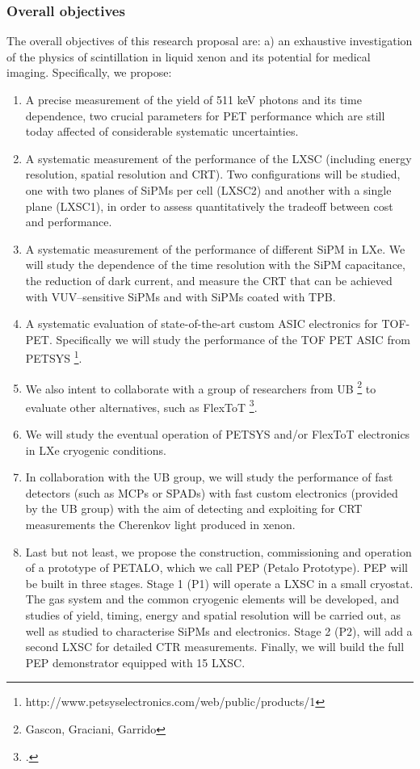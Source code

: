 \subsubsection*{Overall objectives}
The overall objectives of this research proposal are: a) an exhaustive investigation of the physics of scintillation in liquid xenon and its potential for medical imaging. Specifically, we propose:
\begin{enumerate}
\item A precise measurement of the yield of 511 keV photons and its time dependence, two crucial parameters for PET performance which are still today affected of considerable systematic uncertainties.
\item A systematic measurement of the performance of the LXSC (including energy resolution, spatial resolution and CRT). Two configurations will be studied, one with two planes of SiPMs per cell (LXSC2) and another with a single plane (LXSC1), in order to assess quantitatively the tradeoff between cost and performance.
\item A systematic measurement of the performance of different SiPM in LXe. We will study the dependence of the time resolution with the SiPM capacitance, the reduction of dark current, and measure the CRT that can be achieved with VUV--sensitive SiPMs and with SiPMs coated with TPB. 
\item A systematic evaluation of state-of-the-art custom ASIC electronics for TOF-PET. Specifically we will study the performance of the TOF PET ASIC from PETSYS \footnote{http://www.petsyselectronics.com/web/public/products/1}. 
\item We also intent to collaborate with a group of researchers from UB \footnote{Gascon, Graciani, Garrido} to evaluate other alternatives, such as FlexToT \footcite{Trenado:2014vba}. 
\item We will study the eventual operation of PETSYS and/or FlexToT electronics in LXe cryogenic conditions.
\item In collaboration with the UB group, we will study the performance of fast detectors (such as MCPs or SPADs) with fast custom electronics (provided by the UB group) with the aim of detecting and exploiting for CRT measurements the Cherenkov light produced in xenon.  
\item Last but not least, we propose the construction, commissioning and operation of a prototype of PETALO, which we call PEP (Petalo Prototype). PEP will be built in three stages. Stage 1 (P1) will operate a LXSC in a small cryostat. The gas system and the common cryogenic elements will be developed, and studies of yield, timing, energy and spatial resolution will be carried out, as well as studied to characterise SiPMs and electronics.  Stage 2 (P2), will add a second LXSC for detailed CTR measurements. Finally, we will build the full PEP demonstrator equipped with 15 LXSC. 
\end{enumerate}

